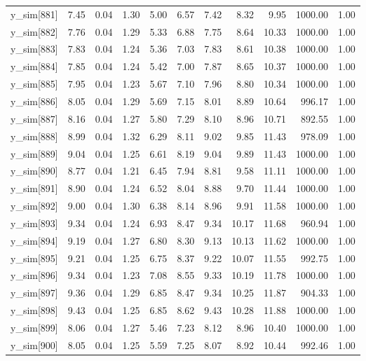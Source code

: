 \begin{table}[ht]
\begin{tabular}{rrrrrrrrrrr}
  y\_sim[881] & 7.45 & 0.04 & 1.30 & 5.00 & 6.57 & 7.42 & 8.32 & 9.95 & 1000.00 & 1.00 \\ 
  y\_sim[882] & 7.76 & 0.04 & 1.29 & 5.33 & 6.88 & 7.75 & 8.64 & 10.33 & 1000.00 & 1.00 \\ 
  y\_sim[883] & 7.83 & 0.04 & 1.24 & 5.36 & 7.03 & 7.83 & 8.61 & 10.38 & 1000.00 & 1.00 \\ 
  y\_sim[884] & 7.85 & 0.04 & 1.24 & 5.42 & 7.00 & 7.87 & 8.65 & 10.37 & 1000.00 & 1.00 \\ 
  y\_sim[885] & 7.95 & 0.04 & 1.23 & 5.67 & 7.10 & 7.96 & 8.80 & 10.34 & 1000.00 & 1.00 \\ 
  y\_sim[886] & 8.05 & 0.04 & 1.29 & 5.69 & 7.15 & 8.01 & 8.89 & 10.64 & 996.17 & 1.00 \\ 
  y\_sim[887] & 8.16 & 0.04 & 1.27 & 5.80 & 7.29 & 8.10 & 8.96 & 10.71 & 892.55 & 1.00 \\ 
  y\_sim[888] & 8.99 & 0.04 & 1.32 & 6.29 & 8.11 & 9.02 & 9.85 & 11.43 & 978.09 & 1.00 \\ 
  y\_sim[889] & 9.04 & 0.04 & 1.25 & 6.61 & 8.19 & 9.04 & 9.89 & 11.43 & 1000.00 & 1.00 \\ 
  y\_sim[890] & 8.77 & 0.04 & 1.21 & 6.45 & 7.94 & 8.81 & 9.58 & 11.11 & 1000.00 & 1.00 \\ 
  y\_sim[891] & 8.90 & 0.04 & 1.24 & 6.52 & 8.04 & 8.88 & 9.70 & 11.44 & 1000.00 & 1.00 \\ 
  y\_sim[892] & 9.00 & 0.04 & 1.30 & 6.38 & 8.14 & 8.96 & 9.91 & 11.58 & 1000.00 & 1.00 \\ 
  y\_sim[893] & 9.34 & 0.04 & 1.24 & 6.93 & 8.47 & 9.34 & 10.17 & 11.68 & 960.94 & 1.00 \\ 
  y\_sim[894] & 9.19 & 0.04 & 1.27 & 6.80 & 8.30 & 9.13 & 10.13 & 11.62 & 1000.00 & 1.00 \\ 
  y\_sim[895] & 9.21 & 0.04 & 1.25 & 6.75 & 8.37 & 9.22 & 10.07 & 11.55 & 992.75 & 1.00 \\ 
  y\_sim[896] & 9.34 & 0.04 & 1.23 & 7.08 & 8.55 & 9.33 & 10.19 & 11.78 & 1000.00 & 1.00 \\ 
  y\_sim[897] & 9.36 & 0.04 & 1.29 & 6.85 & 8.47 & 9.34 & 10.25 & 11.87 & 904.33 & 1.00 \\ 
  y\_sim[898] & 9.43 & 0.04 & 1.25 & 6.85 & 8.62 & 9.43 & 10.28 & 11.88 & 1000.00 & 1.00 \\ 
  y\_sim[899] & 8.06 & 0.04 & 1.27 & 5.46 & 7.23 & 8.12 & 8.96 & 10.40 & 1000.00 & 1.00 \\ 
  y\_sim[900] & 8.05 & 0.04 & 1.25 & 5.59 & 7.25 & 8.07 & 8.92 & 10.44 & 992.46 & 1.00 \\ 

\end{tabular}
\end{table}
